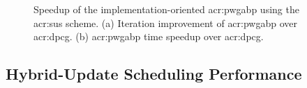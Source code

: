 \begin{figure}[!t]
	\centerline{
	\hfill
	}
	\caption[Speedup of the \acrshort{acr:pwgabp} implementation over \acrshort{acr:dpcg}.]{Speedup of the implementation-oriented \gls{acr:pwgabp} using the \gls{acr:sus} scheme. (a) Iteration improvement of \gls{acr:pwgabp} over \gls{acr:dpcg}. (b) \gls{acr:pwgabp} time speedup over \gls{acr:dpcg}.}
	\label{fig:su}
\end{figure}

\subsection{Hybrid-Update Scheduling Performance}

